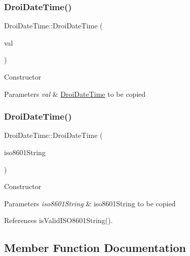 \subsubsection{\texorpdfstring{Droi\+Date\+Time()}{DroiDateTime()}\hspace{0.1cm}{\footnotesize\ttfamily [2/3]}}
{\footnotesize\ttfamily Droi\+Date\+Time\+::\+Droi\+Date\+Time (\begin{DoxyParamCaption}\item[{\hyperlink{class_droi_date_time}{Droi\+Date\+Time} \&}]{val }\end{DoxyParamCaption})}

Constructor 
\begin{DoxyParams}{Parameters}
{\em val} & \hyperlink{class_droi_date_time}{Droi\+Date\+Time} to be copied \\
\hline
\end{DoxyParams}
\mbox{\label{class_droi_date_time_acf75158fb769f5b4cf5f28992f96e722}} 
\subsubsection{\texorpdfstring{Droi\+Date\+Time()}{DroiDateTime()}\hspace{0.1cm}{\footnotesize\ttfamily [3/3]}}
{\footnotesize\ttfamily Droi\+Date\+Time\+::\+Droi\+Date\+Time (\begin{DoxyParamCaption}\item[{const char $\ast$}]{iso8601\+String }\end{DoxyParamCaption})}

Constructor 
\begin{DoxyParams}{Parameters}
{\em iso8601\+String} & iso8601\+String to be copied \\
\hline
\end{DoxyParams}


References is\+Valid\+I\+S\+O8601\+String().



\subsection{Member Function Documentation}
\mbox{\label{class_droi_date_time_ac6f5fc92adafe06844461ae961e476b1}} 
